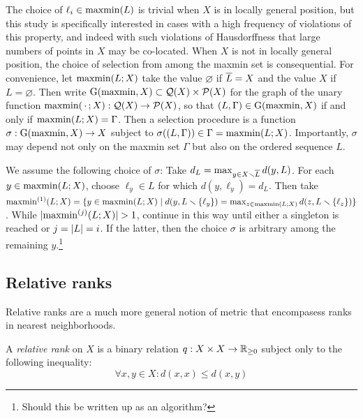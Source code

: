 \documentclass[
]{article}
\begin{document}
The choice of \(\ell_i \in \operatorname{maxmin}(L)\) is trivial when \(X\) is in
locally general position, but this study is specifically interested in
cases with a high frequency of violations of this property, and indeed
with such violations of Hausdorffness that large numbers of points in
\(X\) may be co-located. When \(X\) is not in locally general position,
the choice of selection from among the maxmin set is consequential. For
convenience, let \(\operatorname{maxmin}(L;X)\) take the value \(\varnothing\) if
\(\overline{L}=X\) and the value \(X\) if \(L=\varnothing\). Then write
\(\operatorname{G}(\operatorname{maxmin}, X) \subset \mathcal{Q}(X) \times \mathcal{P}(X)\) for the graph
of the unary function \(\operatorname{maxmin}(\,\cdot\,;X): \mathcal{Q}(X) \to \mathcal{P}(X)\),
so that \((L,\Gamma) \in \operatorname{G}(\operatorname{maxmin}, X)\) if and only if
\(\operatorname{maxmin}(L;X) = \Gamma\). Then a selection procedure is a function
\(\sigma: \operatorname{G}(\operatorname{maxmin}, X) \to X\) subject to
\(\sigma((L,\Gamma)) \in \Gamma = \operatorname{maxmin}(L;X)\). Importantly,
\(\sigma\) may depend not only on the maxmin set \(\Gamma\) but also on
the ordered sequence \(L\).

We assume the following choice of \(\sigma\): Take
\(d_L = \max_{y \in X \smallsetminus \overline{L}}{d(y,L)}\). For each
\(y \in \operatorname{maxmin}(L;X)\), choose \(\ell_y \in L\) for which
\(d(y,\ell_y) = d_L\). Then take
\(\operatorname{maxmin}^{(1)}(L;X) = \{y \in \operatorname{maxmin}(L;X) \mid d(y,L \smallsetminus \{\ell_y\}) = \max_{z \in \operatorname{maxmin}(L;X)}{d(z,L \smallsetminus \{\ell_z\})}\}\).
While \(\lvert \operatorname{maxmin}^{(j)}(L;X)\rvert > 1\), continue in this way until
either a singleton is reached or \(j=\lvert L\rvert=i\). If the latter, then
the choice \(\sigma\) is arbitrary among the remaining \(y\).\footnote{Should
  this be written up as an algorithm?}

\hypertarget{relative-ranks}{%
\subsection{Relative ranks}\label{relative-ranks}}

Relative ranks are a much more general notion of metric that encompasess
ranks in nearest neighborhoods.

\begin{definition}
    A \emph{relative rank} on $X$ is a binary relation $q: X \times X \to \mathbb{R}_{\geq 0}$ subject only to the following inequality:
    \begin{equation}\label{eqn:relative-rank}
        \forall x,y \in X : d(x,x) \leq d(x,y)
    \end{equation}
\end{definition}
\end{document}
